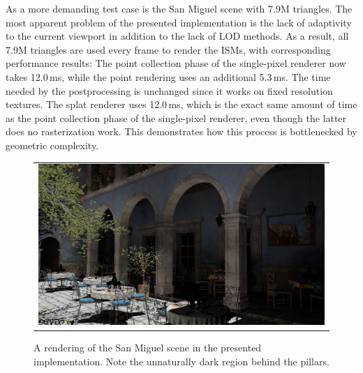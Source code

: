 As a more demanding test case is the San Miguel scene with 7.9M triangles. The most apparent problem of the presented implementation is the lack of adaptivity to the current viewport in addition to the lack of LOD methods. As a result, all 7.9M triangles are used every frame to render the ISMs, with corresponding performance results: The point collection phase of the single-pixel renderer now takes 12.0\,ms, while the point rendering uses an additional 5.3\,ms. The time needed by the postprocessing is unchanged since it works on fixed resolution textures. The splat renderer uses 12.0\,ms, which is the exact same amount of time as the point collection phase of the single-pixel renderer, even though the latter does no rasterization work. This demonstrates how this process is bottlenecked by geometric complexity.


\begin{figure}[htb]
\centering
  \begin{tabular}{@{}c@{}}
    \includegraphics[width=1.0\textwidth]{screenshots/san_miguel_wide} \\
  \end{tabular}
  \caption{A rendering of the San Miguel scene in the presented implementation. Note the unnaturally dark region behind the pillars.}
  \label{fig:results:san_miguel_wide}
\end{figure}


